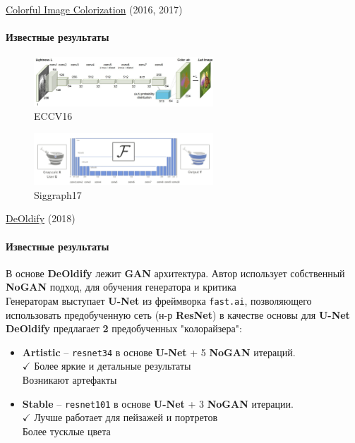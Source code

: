 \documentclass[aspectratio=169]{beamer}
\begin{document}
\begin{frame}{\href{https://github.com/richzhang/colorization}{Colorful Image Colorization} (2016, 2017)}
\framesubtitle{Известные результаты}
        \begin{figure}
            \includegraphics[width=0.6\textwidth]{eccv16.png}
            \caption*{ECCV16}
        \end{figure}

        \begin{figure}
            \includegraphics[width=0.6\textwidth]{siggraph17_white.png}
            \caption*{Siggraph17}
        \end{figure}
\end{frame}

\begin{frame}{\href{https://github.com/jantic/DeOldify}{DeOldify} (2018)}
    \framesubtitle{Известные результаты}

    В основе \textbf{DeOldify} лежит \textbf{GAN} архитектура. Автор использует собственный \textbf{NoGAN} подход, для обучения генератора и критика\\[3mm]
    
    Генераторам выступает \textbf{U-Net} из фреймворка \texttt{fast.ai}, позволяющего использовать предобученную сеть (н-р \textbf{ResNet}) в качестве основы для \textbf{U-Net}\\[3mm]

    \textbf{DeOldify} предлагает \textbf{2} предобученных "колорайзера":\\[3mm]
    \begin{itemize}
        \item \textbf{Artistic} -- \texttt{resnet34} в основе \textbf{U-Net} + 5 \textbf{NoGAN} итераций. \\
        $\checkmark$ Более яркие и детальные результаты \\
         {} Возникают артефакты
        \item \textbf{Stable} -- \texttt{resnet101} в основе \textbf{U-Net} + 3 \textbf{NoGAN} итерации. \\ 
        $\checkmark$ Лучше работает для пейзажей и портретов \\
         {} Более тусклые цвета
    \end{itemize}
\end{frame}
\end{document}
